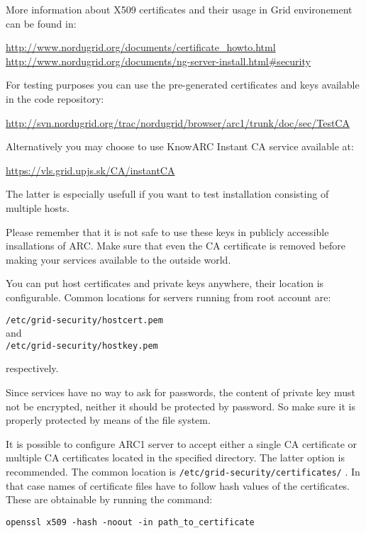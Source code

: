 \documentclass{article}                            %
\begin{document}
More information about X509 certificates and their usage in Grid environement
can be found in:

\url{http://www.nordugrid.org/documents/certificate_howto.html}\\
\url{http://www.nordugrid.org/documents/ng-server-install.html#security}

For testing purposes you can use the pre-generated certificates and keys
available in the code repository:

\url{http://svn.nordugrid.org/trac/nordugrid/browser/arc1/trunk/doc/sec/TestCA}

Alternatively you may choose to use KnowARC Instant CA service available at:

\url{https://vls.grid.upjs.sk/CA/instantCA}

The latter is especially usefull if you want to test installation consisting of
multiple hosts.

Please remember that it is not safe to use these keys in publicly accessible
insallations of ARC. Make sure that even the CA certificate is removed before
making your services available to the outside world.

You can put host certificates and private keys anywhere, their location is
configurable. Common locations for servers running from root account are:

\verb|/etc/grid-security/hostcert.pem| \\and\\
\verb|/etc/grid-security/hostkey.pem|

respectively.

\begin{framed}
Since services have no way to ask for passwords, the content of private key
must not be encrypted, neither it should be protected by password. So make sure
it is properly protected by means of the file system.
\end{framed}

It is possible to configure ARC1 server to accept either a single CA certificate
or multiple CA certificates located in the specified directory. The latter
option is recommended. The common location is
\texttt{/etc/grid-security/certificates/} . In that case names of certificate
files have to follow hash values of the certificates. These are obtainable by
running the command:

\begin{lstlisting}
openssl x509 -hash -noout -in path_to_certificate
\end{lstlisting}
\end{document}
